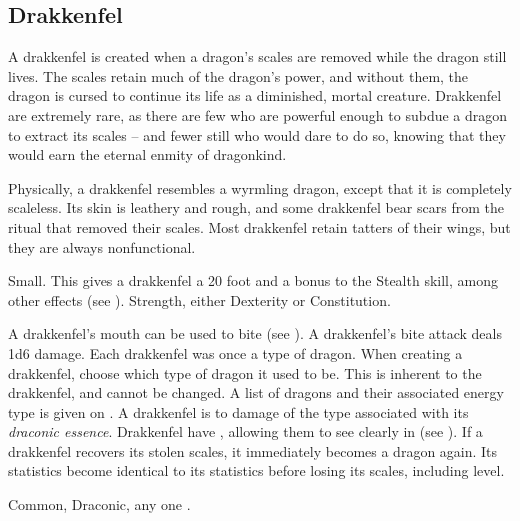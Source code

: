     \subsection{Drakkenfel}

        A drakkenfel is created when a dragon's scales are removed while the dragon still lives. The scales retain much of the dragon's power, and without them, the dragon is cursed to continue its life as a diminished, mortal creature.
        Drakkenfel are extremely rare, as there are few who are powerful enough to subdue a dragon to extract its scales -- and fewer still who would dare to do so, knowing that they would earn the eternal enmity of dragonkind.

        Physically, a drakkenfel resembles a wyrmling dragon, except that it is completely scaleless.
        Its skin is leathery and rough, and some drakkenfel bear scars from the ritual that removed their scales.
        Most drakkenfel retain tatters of their wings, but they are always nonfunctional.

         Small. This gives a drakkenfel a 20 foot  and a  bonus to the Stealth skill, among other effects (see ).
          Strength, either  Dexterity or  Constitution.
        \begin{itemize}
             A drakkenfel's mouth can be used to bite (see ). A drakkenfel's bite attack deals 1d6 damage.
             Each drakkenfel was once a type of dragon.
                When creating a drakkenfel, choose which type of dragon it used to be.
                This is inherent to the drakkenfel, and cannot be changed.
                A list of dragons and their associated energy type is given on .
             A drakkenfel is  to damage of the type associated with its \textit{draconic essence}.
             Drakkenfel have , allowing them to see clearly in  (see ).
             If a drakkenfel recovers its stolen scales, it immediately becomes a dragon again.
                Its statistics become identical to its statistics before losing its scales, including level.
        \end{itemize}
         Common, Draconic, any one .

